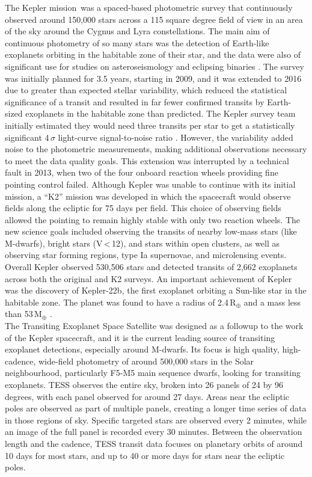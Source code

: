 The Kepler mission\,\citep{2010Koch} was a spaced-based photometric survey that continuously observed around 150,000 stars across a 115 square degree field of view in an area of the sky around the Cygnus and Lyra constellations. The main aim of continuous photometry of so many stars was the detection of Earth-like exoplanets orbiting in the habitable zone of their star, and the data were also of significant use for studies on asteroseismology \citep{2009Stello} and eclipsing binaries \citep{2006Gimenez}. The survey was initially planned for 3.5 years, starting in 2009, and it was extended to 2016 due to greater than expected stellar variability, which reduced the statistical significance of a transit and resulted in far fewer confirmed transits by Earth-sized exoplanets in the habitable zone than predicted. The Kepler survey team initially estimated they would need three transits per star to get a statistically significant 4\,$\sigma$ light-curve signal-to-noise ratio \citep{2011Gilliland}. However, the variability added noise to the photometric measurements, making additional observations necessary to meet the data quality goals. This extension was interrupted by a technical fault in 2013, when two of the four onboard reaction wheels providing fine pointing control failed. Although Kepler was unable to continue with its initial mission, a ``K2'' mission was developed \citep{2014Howell} in which the spacecraft would observe fields along the ecliptic for 75 days per field. This choice of observing fields allowed the pointing to remain highly stable with only two reaction wheels. The new science goals included observing the transits of nearby low-mass stars (like M-dwarfs), bright stars (V\,\textless\,12), and stars within open clusters, as well as observing star forming regions, type Ia supernovae, and microlensing events. Overall Kepler observed 530,506 stars and detected transits of 2,662 exoplanets across both the original and K2 surveys. An important achievement of Kepler was the discovery of Kepler-22b, the first exoplanet orbiting a Sun-like star in the habitable zone. The planet was found to have a radius of 2.4\,R$_\oplus$ and a mass less than 53\,M$_\oplus$ \citep{2013Kipping}.\\

The Transiting Exoplanet Space Satellite \citep[TESS;][]{2009Ricker} was designed as a followup to the work of the Kepler spacecraft, and it is the current leading source of transiting exoplanet detections, especially around M-dwarfs. Its focus is high quality, high-cadence, wide-field photometry of around 500,000 stars in the Solar neighbourhood, particularly F5-M5 main sequence dwarfs, looking for transiting exoplanets. TESS observes the entire sky, broken into 26 panels of 24 by 96 degrees, with each panel observed for around 27 days. Areas near the ecliptic poles are observed as part of multiple panels, creating a longer time series of data in those regions of sky. Specific targeted stars are observed every 2 minutes, while an image of the full panel is recorded every 30 minutes. Between the observation length and the cadence, TESS transit data focuses on planetary orbits of around 10 days for most stars, and up to 40 or more days for stars near the ecliptic poles.\\

